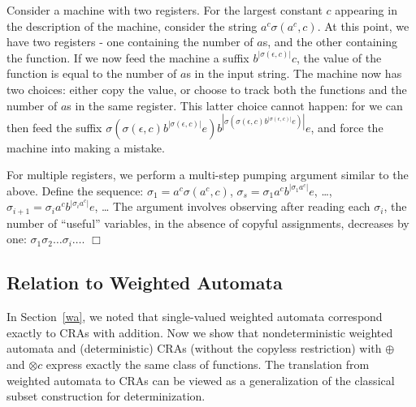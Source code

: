 \documentclass[11pt]{article}
\def\qed{{\bf $\Box$}}
\newcommand{\mypar}[1]{\subsection{#1}}
\def\qed{{\bf $\Box$}}
\newcommand{\sradd}{\oplus}
\newcommand{\srmul}{\otimes}
\begin{document}
Consider a machine with two registers. For the largest constant $c$
appearing in the description of the machine, consider the string $a^{c}\sigma\left(a^{c},c\right)$.
At this point, we have two registers - one containing the number of
$a$s, and the other containing the function. If we now feed the machine
a suffix $b^{\left|\sigma\left(\epsilon,c\right)\right|}c$, the value
of the function is equal to the number of $a$s in the input string.
The machine now has two choices: either copy the value, or choose
to track both the functions and the number of $a$s in the same register.
This latter choice cannot happen: for we can then feed the suffix
$\sigma\left(\sigma\left(\epsilon,c\right)b^{\left|\sigma\left(\epsilon,c\right)\right|}e\right)b^{\left|\sigma\left(\sigma\left(\epsilon,c\right)b^{\left|\sigma\left(\epsilon,c\right)\right|}e\right)\right|}e$,
and force the machine into making a mistake.

For multiple registers, we perform a multi-step pumping argument similar
to the above. Define the sequence: $\sigma_{1}=a^{c}\sigma\left(a^{c},c\right)$,
$\sigma_{s}=\sigma_{1}a^{c}b^{\left|\sigma_{1}a^{c}\right|}e$, \ldots{},
$\sigma_{i+1}=\sigma_{i}a^{c}b^{\left|\sigma_{i}a^{c}\right|}e$,
\ldots{} The argument involves observing after reading each $\sigma_{i}$,
the number of ``useful'' variables, in the absence of copyful assignments,
decreases by one: $\sigma_{1}\sigma_{2}\ldots\sigma_{i}\ldots$.
\qed

\mypar{Relation to Weighted Automata}
In Section~\ref{wa}, we noted that single-valued weighted automata correspond exactly to
CRAs with addition. Now we show that nondeterministic weighted automata and
(deterministic) CRAs (without the copyless restriction)
with $\sradd$ and $\srmul c$ express exactly the same class of functions.
The translation from weighted automata to CRAs can be viewed
as a generalization of the classical subset construction for determinization.
\end{document}
